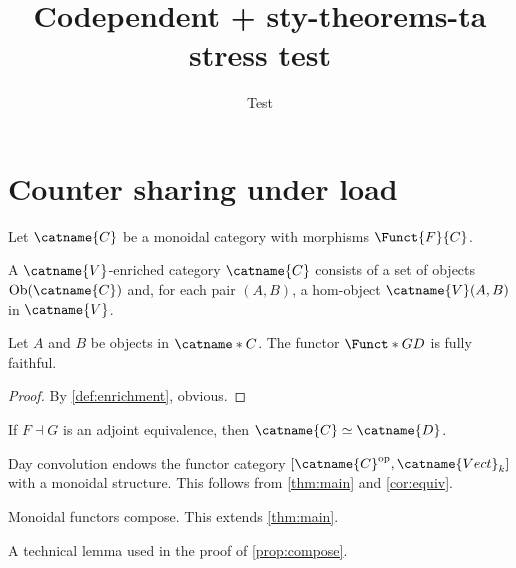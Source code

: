 \documentclass{article}
\title{Codependent + sty-theorems-ta stress test}
\author{Test}
\date{}
\numberwithin{equation}{section}
\begin{document}
\START
\maketitle

\section{Counter sharing under load}
\label{sec:counters}

Let $\catname{C}$ be a monoidal category with morphisms $\Funct{F}{C}$.

\begin{definition}\label{def:enrichment}
A $\catname{V}$-enriched category $\catname{C}$ consists of a set of
objects $\mathrm{Ob}(\catname{C})$ and, for each pair $(A,B)$, a hom-object
$\catname{V}(A,B)$ in $\catname{V}$.
%
\end{definition}

\begin{theorem}\label{thm:main}
Let $A$ and $B$ be objects in $\catname*{C}$.  The functor
$\Funct*{G}{D}$ is fully faithful.
\end{theorem}

\begin{proof}
By \cref{def:enrichment}, obvious.
\end{proof}

\begin{corollary}\label{cor:equiv}
If $F \dashv G$ is an adjoint equivalence, then
$\catname{C} \simeq \catname{D}$.
\end{corollary}

\begin{remark}\label{rem:day}
Day convolution endows the functor category
$[\catname{C}^{\mathrm{op}}, \catname{Vect}_k]$ with a monoidal structure.
This follows from \cref{thm:main} and \cref{cor:equiv}.
\end{remark}

\begin{proposition}\label{prop:compose}
Monoidal functors compose.  This extends \cref{thm:main}.
\end{proposition}

\begin{lemma}\label{lem:technical}
A technical lemma used in the proof of \cref{prop:compose}.
\end{lemma}
\end{document}
